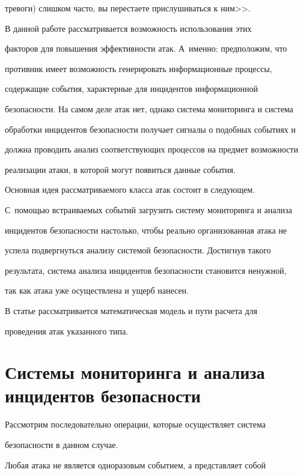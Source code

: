 тревоги) слишком часто, вы перестаете прислушиваться к ним>>. 

    

    В данной работе рассматривается возможность использования этих 

факторов для повышения эффективности атак. А~именно: предположим, что 

противник имеет возможность генерировать информационные процессы, 

содержащие события, характерные для инцидентов информационной 

безопасности. На самом деле атак нет, однако система мониторинга и система 

обработки инцидентов безопасности получает сигналы о подобных событиях и 

должна проводить анализ соответствующих процессов на предмет возможности 

реализации атаки, в которой могут появиться данные события. 

    

    Основная идея рассматриваемого класса атак состоит в следующем. 

С~по\-мощью встраиваемых событий загрузить систему мониторинга и анализа 

инцидентов безопасности настолько, чтобы реально организованная атака не 

успела подвергнуться анализу системой безопасности. Достигнув такого 

результата, система анализа инцидентов безопасности становится ненужной, 

так как атака уже осуществлена и ущерб нанесен.

    

    В статье рассматривается математическая модель и пути расчета для 

проведения атак указанного типа.

    



\section{Системы мониторинга и анализа инцидентов безопасности}



    Рассмотрим последовательно операции, которые осуществляет система 

без\-опас\-ности в данном случае. 

    

    Любая атака не является одноразовым событием, а представляет собой 

